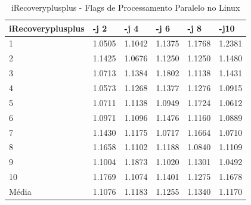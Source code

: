 \begin{table}[!ht]
\centering
\tiny
\caption{iRecoveryplusplus - Flags de Processamento Paralelo no Linux}
\label{tab:flag_processamento_paralelo:linux:irecoveryplusplus}
\begin{tabular}{llllll}
\textbf{iRecoveryplusplus} & \textbf{-j 2} & \textbf{-j 4} & \textbf{-j 6} & \textbf{-j 8} & \textbf{-j10}  \\ \toprule
1                          & 1.0505        &  1.1042       &  1.1375       &  1.1768       &  1.2381        \\ 
2                          & 1.1425        &  1.0676       &  1.1250       &  1.1250       &  1.1480        \\ 
3                          & 1.0713        &  1.1384       &  1.1802       &  1.1138       &  1.1431        \\ 
4                          & 1.0573        &  1.1268       &  1.1377       &  1.1276       &  1.0915        \\ 
5                          & 1.0711        &  1.1138       &  1.0949       &  1.1724       &  1.0612        \\ 
6                          & 1.0971        &  1.1096       &  1.1476       &  1.1160       &  1.0889        \\ 
7                          & 1.1430        &  1.1175       &  1.0717       &  1.1664       &  1.0710        \\ 
8                          & 1.1658        &  1.1102       &  1.1188       &  1.0840       &  1.1109        \\ 
9                          & 1.1004        &  1.1873       &  1.1020       &  1.1301       &  1.0492        \\ 
10                         & 1.1769        &  1.1074       &  1.1401       &  1.1275       &  1.1678        \\ \bottomrule
Média                      & 1.1076        &  1.1183       &  1.1255       &  1.1340       &  1.1170        \\ 
\end{tabular}
\end{table}

